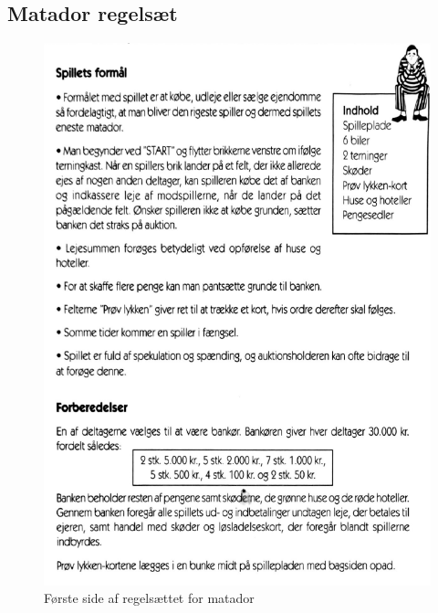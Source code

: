 \begin{flushleft}
\subsection{Matador regelsæt}
\begin{figure}[H] %
    \centering
    \includegraphics[width=14cm]{Report/figures/MatadorRegler1.PNG}
    \caption{Første side af regelsættet for matador}
    \label{MatadorRules1}
\end{figure}
\begin{figure}[H] %
    \centering

\end{figure}
\end{flushleft}
